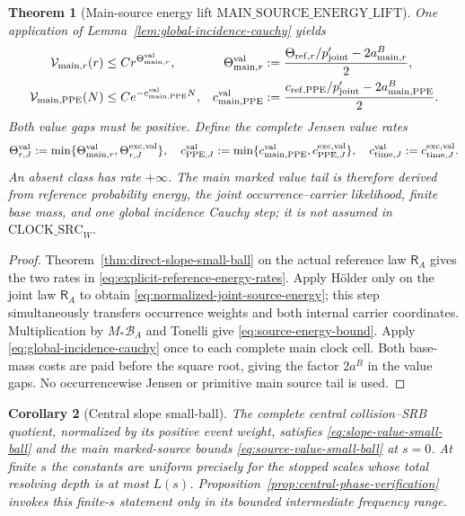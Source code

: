\documentclass[11pt]{article}
\newtheorem{theorem}{Theorem}[section]
\newtheorem{corollary}[theorem]{Corollary}
\begin{document}
\begin{theorem}[Main-source energy lift
$\mathrm{MAIN\_SOURCE\_ENERGY\_LIFT}$]
One application of Lemma~\ref{lem:global-incidence-cauchy} yields
\begin{align}
 \mathcal V_{{\rm main},r}(r)&\le
 Cr^{\Theta_{{\rm main},r}^{\rm val}},&
 \Theta_{{\rm main},r}^{\rm val}&:=
 \frac{\Theta_{{\rm ref},r}/p_{\rm joint}'
             -2a_{{\rm main},r}^{B}}2,\notag\\
 \mathcal V_{{\rm main},{\rm PPE}}(N)&\le
 Ce^{-c_{{\rm main},{\rm PPE}}^{\rm val}N},&
 c_{{\rm main},{\rm PPE}}^{\rm val}&:=
 \frac{c_{{\rm ref},{\rm PPE}}/p_{\rm joint}'
             -2a_{{\rm main},{\rm PPE}}^{B}}2.
 \label{eq:source-value-small-ball}
\end{align}
Both value gaps must be positive.  Define the complete Jensen value rates
\begin{equation}
\label{eq:complete-Jensen-value-rates}
 \Theta_{r,J}^{\rm val}:=\min\{
   \Theta_{{\rm main},r}^{\rm val},
   \Theta_{r,J}^{\rm exc,val}\},
 \quad
 c_{{\rm PPE},J}^{\rm val}:=\min\{
   c_{{\rm main},{\rm PPE}}^{\rm val},
   c_{{\rm PPE},J}^{\rm exc,val}\},
 \quad
 c_{{\rm time},J}^{\rm val}:=c_{{\rm time},J}^{\rm exc,val}.
\end{equation}
An absent class has rate $+\infty$.  The main marked value tail is therefore
derived from reference probability energy, the joint occurrence--carrier
likelihood, finite base mass, and one global incidence Cauchy step; it is not
assumed in
$\mathrm{CLOCK\_SRC}_{W}$.
\end{theorem}

\begin{proof}
Theorem~\ref{thm:direct-slope-small-ball} on the actual reference law
$\mathsf R_A$ gives the two rates in
\eqref{eq:explicit-reference-energy-rates}.  Apply H\"older only on the joint
law $\mathsf R_A$ to obtain \eqref{eq:normalized-joint-source-energy}; this
step simultaneously transfers occurrence weights and both internal carrier
coordinates.  Multiplication by $M_*\mathcal B_A$ and Tonelli give
\eqref{eq:source-energy-bound}.  Apply
\eqref{eq:global-incidence-cauchy} once to each complete main clock cell.
Both base-mass costs are paid before the square root, giving the factor
$2a^B$ in the value gaps.  No occurrencewise Jensen or primitive main source
tail is used.
\end{proof}

\begin{corollary}[Central slope small-ball]
\label{cor:central-g2}
The complete central collision--SRB quotient, normalized by its positive
event weight, satisfies
\eqref{eq:slope-value-small-ball} and the main marked-source bounds
\eqref{eq:source-value-small-ball} at $s=0$.  At finite $s$ the constants are
uniform precisely for the stopped scales whose total resolving depth is at
most $L(s)$.  Proposition~\ref{prop:central-phase-verification} invokes this
finite-$s$ statement only in its bounded intermediate frequency range.
\end{corollary}
\end{document}
